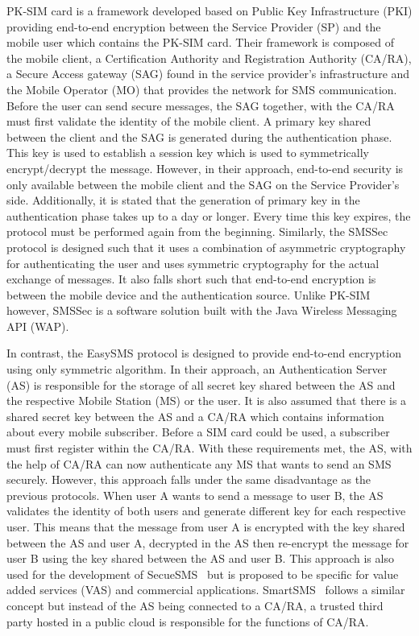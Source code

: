 \documentclass[journal]{./IEEE/IEEEtran}
\begin{document}
PK-SIM \cite{PKSIMcard07} card is a framework developed based on Public Key
Infrastructure (PKI) providing end-to-end encryption between the Service
Provider (SP) and the mobile user which contains the PK-SIM card. Their
framework is composed of the mobile client, a Certification Authority and
Registration Authority (CA/RA), a Secure Access gateway (SAG) found in the service provider's infrastructure and the Mobile Operator (MO) that
provides the network for SMS communication. Before the user can send secure
messages, the SAG together, with the CA/RA must first validate the identity
of the mobile client. A primary key shared between the client and the SAG is
generated during the authentication phase. This key is used to establish
a session key which is used to symmetrically encrypt/decrypt the message.
However, in their approach, end-to-end security is only available between
the mobile client and the SAG on the Service Provider's side. Additionally,
it is stated that the generation of primary key in the authentication phase
takes up to a day or longer. Every time this key expires, the protocol must
be performed again from the beginning. Similarly, the SMSSec~\cite{SMSSec08}
protocol is designed such that it uses a combination of asymmetric
cryptography for authenticating the user and uses symmetric cryptography
for the actual exchange of messages. It also falls short such that
end-to-end encryption is between the mobile device and the authentication
source. Unlike PK-SIM however, SMSSec is a software solution built with
the Java Wireless Messaging API (WAP).

In contrast, the EasySMS \cite{EasySMS14} protocol is designed to provide
end-to-end encryption using only symmetric algorithm. In their approach,
an Authentication Server (AS) is responsible for the storage of all secret key
shared between the AS and the respective Mobile Station (MS) or the user.
It is also assumed that there is a shared secret key between the AS and a
CA/RA which contains information about every mobile subscriber. Before a SIM
card could be used, a subscriber must first register within the CA/RA. With
these requirements met, the AS, with the help of CA/RA can now authenticate
any MS that wants to send an SMS securely. However, this approach falls under
the same disadvantage as the previous protocols. When user A wants to send a message to user B, the AS validates the identity of both users and generate
different key for each respective user. This means that the message from
user A is encrypted with the key shared between the AS and user A, decrypted
in the AS then re-encrypt the message for user B using the key shared between
the AS and user B. This approach is also used for the development of
SecueSMS~\cite{SecureSMS14} but is proposed to be specific for value added
services (VAS) and commercial applications. SmartSMS~\cite{SmartSMS16} follows
a similar concept but instead of the AS being connected to a CA/RA, a
trusted third party hosted in a public cloud is responsible for the
functions of CA/RA.
\end{document}
